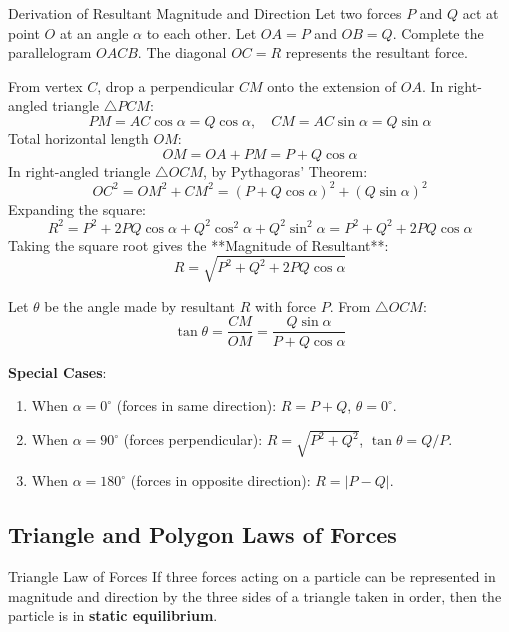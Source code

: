 \documentclass[11pt,a4paper]{article}
\begin{document}
\begin{proofbox}{Derivation of Resultant Magnitude and Direction}
Let two forces $P$ and $Q$ act at point $O$ at an angle $\alpha$ to each other. Let $OA = P$ and $OB = Q$. Complete the parallelogram $OACB$. The diagonal $OC = R$ represents the resultant force.

From vertex $C$, drop a perpendicular $CM$ onto the extension of $OA$.
In right-angled triangle $\triangle PCM$:
\[
PM = AC \cos\alpha = Q \cos\alpha, \quad CM = AC \sin\alpha = Q \sin\alpha
\]
Total horizontal length $OM$:
\[
OM = OA + PM = P + Q \cos\alpha
\]
In right-angled triangle $\triangle OCM$, by Pythagoras' Theorem:
\[
OC^2 = OM^2 + CM^2 = (P + Q \cos\alpha)^2 + (Q \sin\alpha)^2
\]
Expanding the square:
\[
R^2 = P^2 + 2PQ \cos\alpha + Q^2 \cos^2\alpha + Q^2 \sin^2\alpha = P^2 + Q^2 + 2PQ \cos\alpha
\]
Taking the square root gives the **Magnitude of Resultant**:
\begin{equation}
R = \sqrt{P^2 + Q^2 + 2PQ \cos\alpha}
\end{equation}

Let $\theta$ be the angle made by resultant $R$ with force $P$. From $\triangle OCM$:
\begin{equation}
\tan\theta = \frac{CM}{OM} = \frac{Q \sin\alpha}{P + Q \cos\alpha}
\end{equation}

\textbf{Special Cases}:
\begin{enumerate}
    \item When $\alpha = 0^\circ$ (forces in same direction): $R = P + Q$, $\theta = 0^\circ$.
    \item When $\alpha = 90^\circ$ (forces perpendicular): $R = \sqrt{P^2 + Q^2}$, $\tan\theta = Q / P$.
    \item When $\alpha = 180^\circ$ (forces in opposite direction): $R = |P - Q|$.
\end{enumerate}
\end{proofbox}

\subsection{Triangle and Polygon Laws of Forces}

\begin{theorembox}{Triangle Law of Forces}
If three forces acting on a particle can be represented in magnitude and direction by the three sides of a triangle taken in order, then the particle is in \textbf{static equilibrium}.
\end{theorembox}
\end{document}
